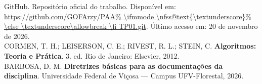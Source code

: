 \documentclass[12pt,a4paper]{article}
\makeatletter
\DeclareRobustCommand{\_}{%
  \ifmmode
    \nfss@text{\textunderscore}%
  \else
    \textunderscore\allowbreak
  \fi
}
\makeatother
\begin{document}
\noindent [1] GitHub. Reposit\'{o}rio oficial do trabalho. Dispon\'{i}vel em: \url{https://github.com/GOFArzy/PAA\_TP01.git}. \'{U}ltimo acesso em: 20 de novembro de 2026.\\[0.35cm]
\noindent [2] CORMEN, T. H.; LEISERSON, C. E.; RIVEST, R. L.; STEIN, C. \textbf{Algoritmos: Teoria e Pr\'{a}tica}. 3. ed. Rio de Janeiro: Elsevier, 2012.\\[0.35cm]
\noindent [3] BARBOSA, D. M. \textbf{Diretrizes b\'{a}sicas para as documenta\c{c}\~{o}es da disciplina}. Universidade Federal de Vi\c{c}osa --- Campus UFV-Florestal, 2026.
\end{document}
